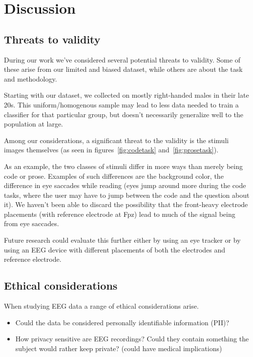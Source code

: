 \section{Discussion}

\subsection{Threats to validity}

    During our work we've considered several potential threats to validity. Some of these arise from our limited and biased dataset, while others are about the task and methodology.

    Starting with our dataset, we collected on mostly right-handed males in their late 20s. This uniform/homogenous sample may lead to less data needed to train a classifier for that particular group, but doesn't necessarily generalize well to the population at large.

    Among our considerations, a significant threat to the validity is the stimuli images themselves (as seen in figures~\ref{fig:codetask} and~\ref{fig:prosetask}). 

    As an example, the two classes of stimuli differ in more ways than merely being code or prose. Examples of such differences are the background color, the difference in eye saccades while reading (eyes jump around more during the code tasks, where the user may have to jump between the code and the question about it). We haven't been able to discard the possibility that the front-heavy electrode placements (with reference electrode at Fpz) lead to much of the signal being from eye saccades. 

    Future research could evaluate this further either by using an eye tracker or by using an EEG device with different placements of both the electrodes and reference electrode.


\subsection{Ethical considerations}

    When studying EEG data a range of ethical considerations arise. 

    \begin{itemize}
        \item Could the data be considered personally identifiable information (PII)? 
        \item How privacy sensitive are EEG recordings? Could they contain something the subject would rather keep private? (could have medical implications)
    \end{itemize}

